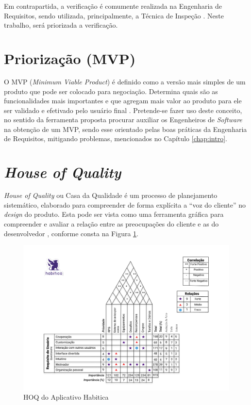 Em contrapartida, a verificação é comumente realizada na Engenharia de Requisitos, sendo utilizada, principalmente, a Técnica de Inspeção \cite{design_fagan} \cite{verification_MR}. Neste trabalho, será priorizada a verificação.

\section{Priorização (MVP)}

\label{sec:priorizacao}

O MVP (\textit{Minimum Viable Product}) é definido como a versão mais simples de um produto que pode ser colocado para negociação. Determina quais são as funcionalidades mais importantes e que agregam mais valor ao produto para ele ser validado e efetivado pelo usuário final \cite{carolipaulo2018}. Pretende-se fazer uso deste conceito, no sentido da ferramenta proposta procurar auxiliar os Engenheiros de \textit{Software} na obtenção de um MVP, sendo esse orientado pelas boas práticas da Engenharia de Requisitos, mitigando problemas, mencionados no Capítulo \ref{chap:intro}.

\section{\textit{House of Quality}}

\label{sec:house_of_quality}

\textit{House of Quality} ou Casa da Qualidade é um processo de planejamento sistemático, elaborado para compreender de forma explícita a “voz do cliente” no \textit{design} do produto. Esta pode ser vista como uma ferramenta gráfica para compreender e avaliar a relação entre as preocupações do cliente e as do desenvolvedor \cite{Howard_1}, conforme consta na Figura \ref{fig:hoq}.

\begin{figure}[H]
    \begin{center}
        \caption{HOQ do Aplicativo Habitica}
        \label{fig:hoq}
        \includegraphics[scale=0.45]{figuras/referencial_teorico/HOQ.jpg}
    \end{center}
\end{figure}

